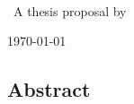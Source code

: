 \begin{titlepage}
\begin{center}

~\\
~\\

\thispagestyle{empty}

\titleFont\LARGE\thesisTitle



~\\

\large~A thesis proposal by \thesisAuthor

\vfill

\today

\end{center}
\end{titlepage}

\newpage
\thispagestyle{empty}
\vspace*{1.25in}
\subsection*{Abstract}
\noindent\thesisAbstract
\newpage